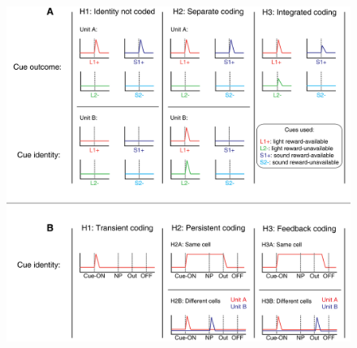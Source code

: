 \documentclass[11pt]{article}
\begin{document}
\begin{figure}[h]
\centering
\includegraphics[height=0.5\textheight]{Fig 1 - Schematic neural.png}

\end{figure}
\end{document}
